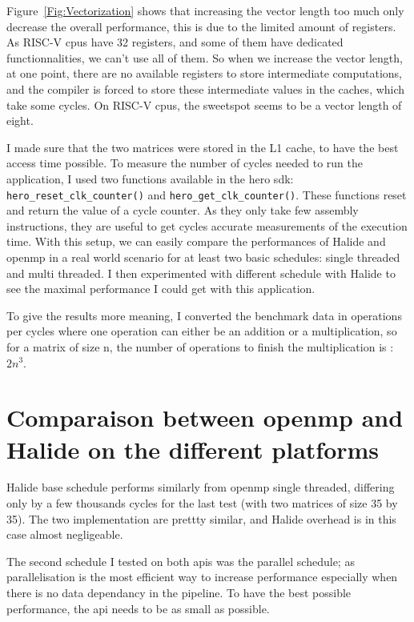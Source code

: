 	Figure~\ref{Fig:Vectorization} shows that increasing the vector length too much only decrease the overall performance, this is due to the limited amount of registers. As RISC-V \glspl{cpu} have 32 registers, and some of them have dedicated functionnalities, we can't use all of them.
	So when we increase the vector length, at one point, there are no available registers to store intermediate computations, and the compiler is forced to store these intermediate values in the caches, which take some  cycles.
	On RISC-V \glspl{cpu}, the sweetspot seems to be a vector length of eight.







I made sure that the two matrices were stored in the L1 cache, to have the best access time possible.
	To measure the number of cycles needed to run the application, I used two functions available in the hero sdk: \texttt{hero\_reset\_clk\_counter()} and \texttt{hero\_get\_clk\_counter()}. These functions reset and return the value of a cycle counter. As they only take few assembly instructions, they are useful to get cycles accurate measurements of the execution time.
	With this setup, we can easily compare the performances of Halide and \gls{openmp} in a real world scenario for at least two basic schedules: single threaded and multi threaded. I then experimented with different schedule with Halide to see the maximal performance I could get with this application.

	To give the results more meaning, I converted the benchmark data in operations per cycles where one operation can either be an addition or a multiplication, so for a matrix of size n, the number of operations to finish the multiplication is : $2n^3$.

\section{Comparaison between \acrshort{openmp} and Halide on the different platforms}



	Halide base schedule performs similarly from \gls{openmp} single threaded, differing only by a few thousands cycles for the last test (with two matrices of size 35 by 35).
	The two implementation are prettty similar, and Halide overhead is in this case almost negligeable.

	The second schedule I tested on both \glspl{api} was the parallel schedule; as parallelisation is the most efficient way to increase performance especially when there is no data dependancy in the pipeline. To have the best possible performance, the \gls{api} needs to be as small as possible.

